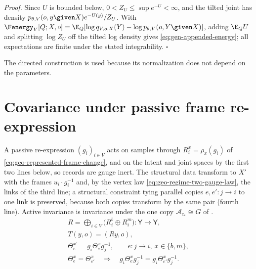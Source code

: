 \noindent\emph{Proof.}
Since $U$ is bounded below, $0<Z_U\leq\sup e^{-U}<\infty$, and the tilted joint has density
$p_{\theta,V}(o,y\given X)e^{-U(y)}/Z_U$. With $\Fenergy_V[Q;X,o]=\E_Q[\log q_{V,o,X}(Y)-\log p_{\theta,V}(o,Y\given X)]$,
adding $\E_QU$ and splitting $\log Z_U$ off the tilted log density gives \eqref{eq:gen-appended-energy}; all
expectations are finite under the stated integrability. \hfill$\square$

The directed construction is used because its normalization does not depend on the parameters.

\section{Covariance under passive frame re-expression}
\label{sec:gen-gauge}

A passive re-expression $(g_i)_{i\in V}$ acts on samples through $R_i^x=\rho_x(g_i)$ of
\eqref{eq:geo-represented-frame-change}, and on the latent and joint spaces by the first two lines
below, so records are gauge inert. The structural data transform to $X'$ with the frames
$u_i\cdot g_i^{-1}$ and, by the vertex law \eqref{eq:geo-regime-two-gauge-law}, the links of the third
line; a structural constraint tying parallel copies $e,e':j\to i$ to one link is preserved, because both
copies transform by the same pair (fourth line). Active invariance is invariance under the one copy
$\mathcal A_{c_*}\cong G$ of .
\begin{gather}
R=\bigoplus_{i\in V}\bigl(R_i^b\oplus R_i^m\bigr):\mathsf Y\longrightarrow\mathsf Y,
\label{eq:gen-rep-actions}\\
T(y,o)=(Ry,o),
\label{eq:gen-contextual-frame-change}\\
\Theta_e^{x\prime}=g_i\Theta_e^xg_j^{-1},
\qquad e:j\to i,\ x\in\{b,m\},
\label{eq:gen-gauge-links}\\
\Theta_e^x=\Theta_{e'}^x
\quad\Longrightarrow\quad
g_i\Theta_e^xg_j^{-1}=g_i\Theta_{e'}^xg_j^{-1}.
\label{eq:gen-shared-link-admissibility}
\end{gather}

